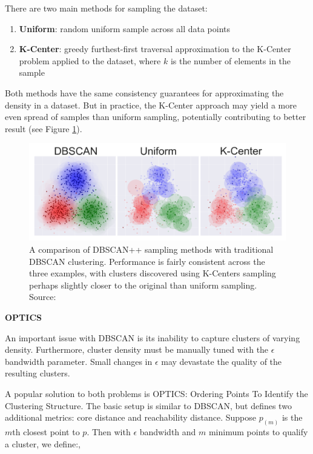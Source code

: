 There are two main methods for sampling the dataset:
\begin{enumerate}
    \item \textbf{Uniform}: random uniform sample across all data points
    \item \textbf{K-Center}: greedy furthest-first traversal approximation to the K-Center problem applied to the dataset, where $k$ is the number of elements in the sample
\end{enumerate}

Both methods have the same consistency guarantees for approximating the density in a dataset. But in practice, the K-Center approach may yield a more even spread of samples than uniform sampling, potentially contributing to better result (see Figure \ref{fig:dbscan_plus}).

\begin{figure}[h]
\centering
\includegraphics[scale=0.27]{chapter_2/files/dbscan_plus_comparison.png}
\caption{A comparison of DBSCAN++ sampling methods with traditional DBSCAN clustering. Performance is fairly consistent across the three examples, with clusters discovered using K-Centers sampling perhaps slightly closer to the original than uniform sampling. Source: \cite{dbscanpp}}
\label{fig:dbscan_plus}
\end{figure}

\noindent \textbf{OPTICS}

An important issue with DBSCAN is its inability to capture clusters of varying density. Furthermore, cluster density must be manually tuned with the $\epsilon$ bandwidth parameter. Small changes in $\epsilon$ may devastate the quality of the resulting clusters.

A popular solution to both problems is OPTICS: Ordering Points To Identify the Clustering Structure. The basic setup is similar to DBSCAN, but defines two additional metrics: core distance and reachability distance. Suppose $p_{(m)}$ is the $m$th closest point to $p$. Then with $\epsilon$ bandwidth and $m$ minimum points to qualify a cluster, we define:\cite{wiki:optics}, \cite{medium:optics}


